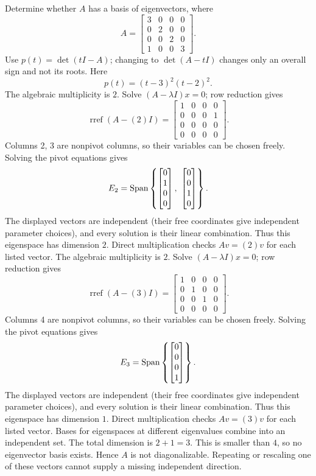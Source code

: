 \goal Determine whether $A$ has a basis of eigenvectors, where
\[A=\begin{bmatrix}3&0&0&0\\0&2&0&0\\0&0&2&0\\1&0&0&3\end{bmatrix}.\]
Use $p(t)=\det(tI-A)$; changing to $\det(A-tI)$ changes only an overall sign and not its roots. Here
\[p(t)=\left(t - 3\right)^{2} \left(t - 2\right)^{2}.\]
The algebraic multiplicity is $2$. Solve $(A-\lambda I)x=0$; row reduction gives
\[\operatorname{rref}(A-(2)I)=\begin{bmatrix}1&0&0&0\\0&0&0&1\\0&0&0&0\\0&0&0&0\end{bmatrix}.\]
Columns 2, 3 are nonpivot columns, so their variables can be chosen freely. Solving the pivot equations gives
\[E_{2}=\Span\left\{\begin{bmatrix}0\\1\\0\\0\end{bmatrix},\ \begin{bmatrix}0\\0\\1\\0\end{bmatrix}\right\}.\]
The displayed vectors are independent (their free coordinates give independent parameter choices), and every solution is their linear combination. Thus this eigenspace has dimension $2$. Direct multiplication checks $Av=(2)v$ for each listed vector.
The algebraic multiplicity is $2$. Solve $(A-\lambda I)x=0$; row reduction gives
\[\operatorname{rref}(A-(3)I)=\begin{bmatrix}1&0&0&0\\0&1&0&0\\0&0&1&0\\0&0&0&0\end{bmatrix}.\]
Columns 4 are nonpivot columns, so their variables can be chosen freely. Solving the pivot equations gives
\[E_{3}=\operatorname{Span}\left\{\begin{bmatrix}0\\0\\0\\1\end{bmatrix}\right\}.\]
The displayed vectors are independent (their free coordinates give independent parameter choices), and every solution is their linear combination. Thus this eigenspace has dimension $1$. Direct multiplication checks $Av=(3)v$ for each listed vector.
Bases for eigenspaces at different eigenvalues combine into an independent set. The total dimension is $2+1=3$.
This is smaller than $4$, so no eigenvector basis exists. Hence $A$ is not diagonalizable. Repeating or rescaling one of these vectors cannot supply a missing independent direction.



